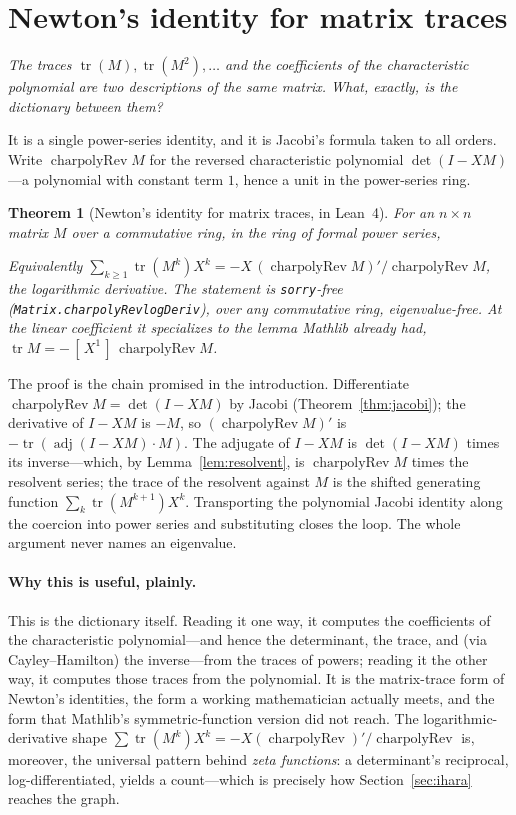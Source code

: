 \documentclass[11pt]{article}
\newtheorem{theorem}{Theorem}
\newcommand{\lean}[1]{{\def\_{\textunderscore\allowbreak}\texttt{#1}}}
\newcommand{\tr}{\operatorname{tr}}
\newcommand{\adj}{\operatorname{adj}}
\DeclareMathOperator{\charpolyRev}{charpolyRev}
\newcommand{\keyeq}[1]{\begin{center}\keybox{$\displaystyle #1$}\end{center}}
\begin{document}
\section{Newton's identity for matrix traces}
\label{sec:newton}

\emph{The traces $\tr(M),\tr(M^2),\dots$ and the coefficients of the characteristic polynomial are
two descriptions of the same matrix. What, exactly, is the dictionary between them?}

It is a single power-series identity, and it is Jacobi's formula taken to all orders. Write
$\charpolyRev M$ for the reversed characteristic polynomial $\det(I-XM)$---a polynomial with constant
term $1$, hence a unit in the power-series ring.

\begin{theorem}[Newton's identity for matrix traces, in Lean~4]
\label{thm:newton}
For an $n\times n$ matrix $M$ over a commutative ring, in the ring of formal power series,
\keyeq{(\charpolyRev M)'\;=\;-\,\charpolyRev M\cdot\sum_{k\ge0}\tr(M^{k+1})\,X^k.}
Equivalently $\sum_{k\ge1}\tr(M^k)X^k=-X\,(\charpolyRev M)'/\charpolyRev M$, the logarithmic
derivative. The statement is \lean{sorry}-free (\lean{Matrix.charpolyRev\_logDeriv}), over any
commutative ring, eigenvalue-free. At the linear coefficient it specializes to the lemma Mathlib
already had, $\tr M=-\,[\,X^1\,]\,\charpolyRev M$.
\end{theorem}

The proof is the chain promised in the introduction. Differentiate $\charpolyRev M=\det(I-XM)$ by
Jacobi (Theorem~\ref{thm:jacobi}); the derivative of $I-XM$ is $-M$, so $(\charpolyRev M)'$ is
$-\tr(\adj(I-XM)\cdot M)$. The adjugate of $I-XM$ is $\det(I-XM)$ times its inverse---which, by
Lemma~\ref{lem:resolvent}, is $\charpolyRev M$ times the resolvent series; the trace of the resolvent
against $M$ is the shifted generating function $\sum_k\tr(M^{k+1})X^k$. Transporting the polynomial
Jacobi identity along the coercion into power series and substituting closes the loop. The whole
argument never names an eigenvalue.

\paragraph{Why this is useful, plainly.}
This is the dictionary itself. Reading it one way, it computes the coefficients of the characteristic
polynomial---and hence the determinant, the trace, and (via Cayley--Hamilton) the inverse---from the
traces of powers; reading it the other way, it computes those traces from the polynomial. It is the
matrix-trace form of Newton's identities, the form a working mathematician actually meets, and the
form that Mathlib's symmetric-function version did not reach. The logarithmic-derivative shape
$\sum\tr(M^k)X^k=-X(\charpolyRev)'/\charpolyRev$ is, moreover, the universal pattern behind \emph{zeta
functions}: a determinant's reciprocal, log-differentiated, yields a count---which is precisely how
Section~\ref{sec:ihara} reaches the graph.
\end{document}
